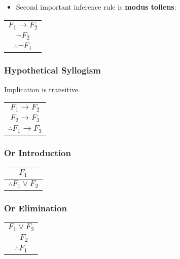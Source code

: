 \documentclass[8pt]{scrreprt}
\begin{document}
\begin{landscape}
\begin{multicols*}{3}
\begin{itemize}
	\item Second important inference rule is \textbf{modus tollens}:
\end{itemize}

\begin{center}
	\begin{tabular}{c}
		$F_1\rightarrow F_2$  \\
		$\neg F_2$            \\
		\hline
		$\therefore \neg F_1$ \\
	\end{tabular}
\end{center}

\subsubsection{Hypothetical Syllogism}

Implication is transitive.

\begin{center}
	\begin{tabular}{c}
		$F_1\rightarrow F_2$            \\
		$F_2\rightarrow F_3$            \\
		\hline
		$\therefore F_1\rightarrow F_3$ \\
	\end{tabular}
\end{center}

\subsubsection{Or Introduction}

\begin{center}
	\begin{tabular}{c}
		$F_1$                    \\
		\hline
		$\therefore F_1\lor F_2$ \\
	\end{tabular}
\end{center}

\subsubsection{Or Elimination}

\begin{center}
	\begin{tabular}{c}
		$F_1\lor F_2$    \\
		$\neg F_2$       \\
		\hline
		$\therefore F_1$ \\
	\end{tabular}
\end{center}


\end{multicols*}
\end{landscape}
\end{document}

